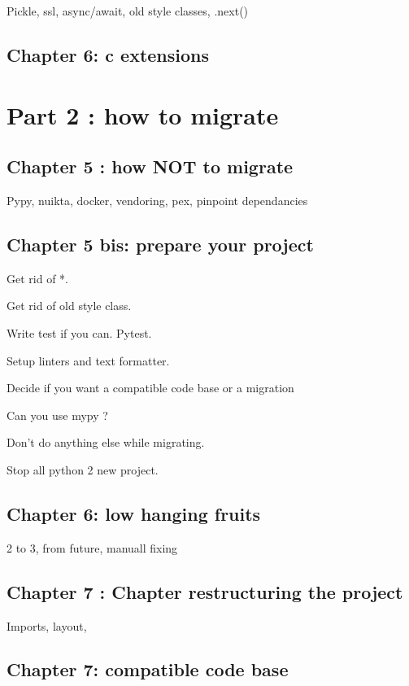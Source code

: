 \documentclass[paperwidth=8in, paperheight=10in,lang=en]{elegantbook}
\begin{document}
Pickle, ssl, async/await, old style classes, .next()

\chapter{Chapter 6:  c extensions}

\part{Part 2 : how to migrate}

\chapter{Chapter 5 : how NOT to migrate}

Pypy, nuikta, docker, vendoring, pex, pinpoint dependancies

\chapter{Chapter 5 bis: prepare your project}

Get rid of *.

Get rid of old style class.

Write test if you can. Pytest.

Setup linters and text formatter.

Decide if you want a compatible code base or a migration

Can you use mypy ?

Don't do anything else while migrating.

Stop all python 2 new project.

\chapter{Chapter 6: low hanging fruits}

2 to 3, from future, manuall fixing

\chapter{Chapter 7 : Chapter restructuring the project}

Imports, layout,

\chapter{Chapter 7: compatible code base}
\end{document}
